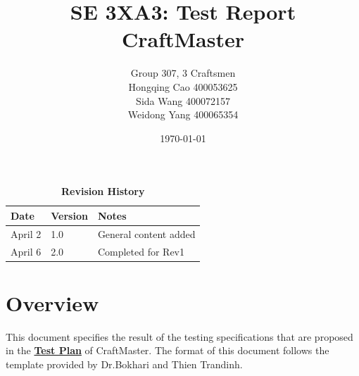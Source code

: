 \documentclass[12pt, titlepage]{article}
\title{SE 3XA3: Test Report\\CraftMaster}
\author{Group 307, 3 Craftsmen
		\\ Hongqing Cao 400053625
		\\ Sida Wang 400072157
		\\ Weidong Yang 400065354
}
\date{\today}
\begin{document}
\maketitle

\tableofcontents
\listoftables
\listoffigures
\FloatBarrier
\begin{table}[bp]
\begin{tabularx}{\textwidth}{p{3cm}p{2cm}X}
\toprule {\bf Date} & {\bf Version} & {\bf Notes}\\
\midrule
April 2 & 1.0 & General content added\\
April 6 & 2.0 & Completed for Rev1\\
\bottomrule
\end{tabularx}
\caption{\bf Revision History}
\end{table}
\FloatBarrier
\newpage


\section{Overview}
This document specifies the result of the testing specifications that are proposed in the \href{https://gitlab.cas.mcmaster.ca/wangs132/minecraft/-/blob/master/Doc/TestPlan/TestPlan.pdf}{\bf Test Plan} of CraftMaster. The format of this document follows the template provided by Dr.Bokhari and Thien Trandinh.
\end{document}
